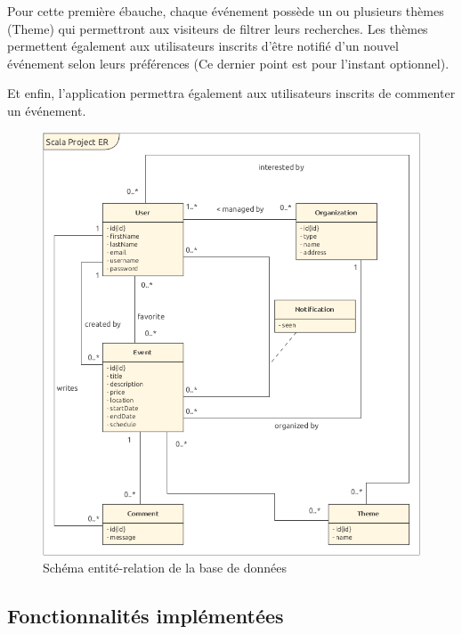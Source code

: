 \documentclass[11pt, a4paper, french, twoside]{article}
\begin{document}
			Pour cette première ébauche, chaque événement possède un ou plusieurs thèmes (Theme) qui permettront aux visiteurs de filtrer leurs recherches. Les thèmes permettent également aux utilisateurs inscrits d'être notifié d'un nouvel événement selon leurs préférences (Ce dernier point est pour l'instant optionnel).
			
			Et enfin, l'application permettra également aux utilisateurs inscrits de commenter un événement.
			
			\begin{figure}[h]
				\centering
				\includegraphics[width=0.8\linewidth]{images/project_ER.png}
				\caption{Schéma entité-relation de la base de données}
				\label{fig:er}
			\end{figure}
		
		\subsection{Fonctionnalités implémentées}
		\label{subsec:fonctionnalites_implementees}
	
\end{document}
